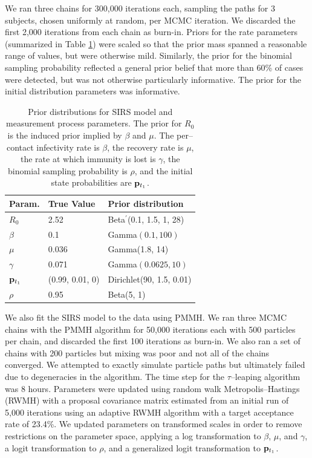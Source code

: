 We ran three chains for 300,000 iterations each, sampling the paths for 3 subjects, chosen uniformly at random, per MCMC iteration. We discarded the first 2,000 iterations from each chain as burn-in. Priors for the rate parameters (summarized in Table \ref{tab:sim1_sirs_priors}) were scaled so that the prior mass spanned a reasonable range of values, but were otherwise mild. Similarly, the prior for the binomial sampling probability reflected a general prior belief that more than 60\% of cases were detected, but was not otherwise particularly informative. The prior for the initial distribution parameters was informative.

\begin{table}[htbp]
	\centering
	\begin{tabular}{lll}
		\hline
		Param. & True Value & Prior distribution \\ 
		\hline
		$ R_0 $ & 2.52 & Beta$ ^\prime $(0.1, 1.5, 1, 28) \\
		$ \beta $ & 0.1 & Gamma$ (0.1, 100) $ \\
		$ \mu $ & 0.036 & Gamma(1.8, 14)  \\ 
		$ \gamma $ & 0.071 & Gamma$ (0.0625, 10) $\\ 
		$ \mathbf{p}_{t_1} $ & (0.99, 0.01, 0) & Dirichlet(90, 1.5, 0.01)  \\ 
		$ \rho $ & 0.95 & Beta(5, 1) \\
		\hline
	\end{tabular}
	\caption{Prior distributions for SIRS model and measurement process parameters. The prior for $ R_0 $ is the induced prior implied by $ \beta $ and $ \mu $. The per--contact infectivity rate is $ \beta $, the recovery rate is $ \mu $, the rate at which immunity is lost is $ \gamma $, the binomial sampling probability is $ \rho $, and the initial state probabilities are $ \mathbf{p}_{t_1} $.}
	\label{tab:sim1_sirs_priors}
\end{table}

We also fit the SIRS model to the data using PMMH. We ran three MCMC chains with the PMMH algorithm for 50,000 iterations each with 500 particles per chain, and discarded the first 100 iterations as burn-in. We also ran a set of chains with 200 particles but mixing was poor and not all of the chains converged. We attempted to exactly simulate particle paths but ultimately failed due to degeneracies in the algorithm. The time step for the $ \tau $--leaping algorithm was 8 hours. Parameters were updated using random walk Metropolis--Hastings (RWMH) with a proposal covariance matrix estimated from an initial run of 5,000 iterations using an adaptive RWMH algorithm with a target acceptance rate of 23.4\%. We updated parameters on transformed scales in order to remove restrictions on the parameter space, applying a log transformation to $ \beta $, $ \mu $, and $ \gamma $, a logit transformation to $ \rho $, and a generalized logit transformation to $ \mathbf{p}_{t_1} $.

